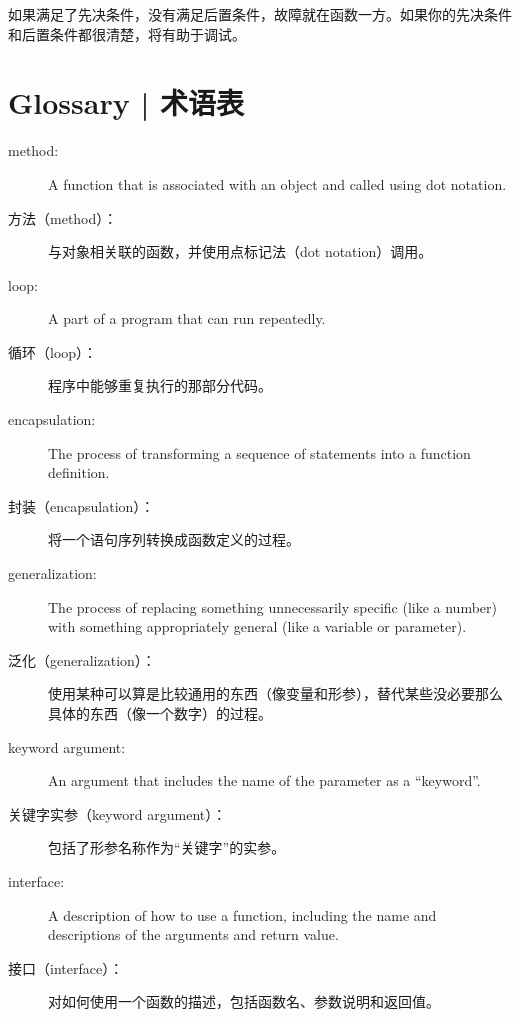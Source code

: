 如果满足了先决条件，没有满足后置条件，故障就在函数一方。如果你的先决条件和后置条件都很清楚，将有助于调试。


\section{Glossary  |  术语表}

\begin{description}

\item[method:] A function that is associated with an object and called
using dot notation.

\item[方法（method）：]
    与对象相关联的函数，并使用点标记法（dot notation）调用。

\item[loop:] A part of a program that can run repeatedly.

\item[循环（loop）：]
    程序中能够重复执行的那部分代码。

\item[encapsulation:] The process of transforming a sequence of
statements into a function definition.

\item[封装（encapsulation）：]
    将一个语句序列转换成函数定义的过程。

\item[generalization:] The process of replacing something
unnecessarily specific (like a number) with something appropriately
general (like a variable or parameter).

\item[泛化（generalization）：]
    使用某种可以算是比较通用的东西（像变量和形参），替代某些没必要那么具体的东西（像一个数字）的过程。

\item[keyword argument:] An argument that includes the name of
the parameter as a ``keyword''.

\item[关键字实参（keyword argument）：]
    包括了形参名称作为“关键字”的实参。

\item[interface:] A description of how to use a function, including
the name and descriptions of the arguments and return value.

\item[接口（interface）：]
    对如何使用一个函数的描述，包括函数名、参数说明和返回值。



\end{description}
